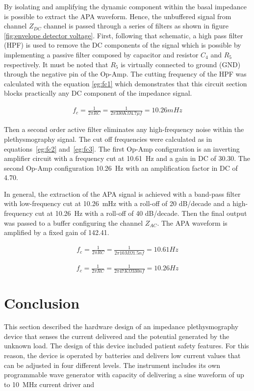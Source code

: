 By isolating and amplifying the dynamic component within the basal impedance is possible to extract the APA waveform. Hence, the unbuffered signal from channel $Z_{DC}$ channel is passed through a series of filters as shown in figure \ref{fig:envelope detector voltage}. First, following that schematic, a high pass filter (HPF) is used to remove the DC components of the signal which is possible by implementing a passive filter composed by capacitor and resistor  $C_4$ and $R_5$ respectively. It must be noted that $R_5$ is virtually connected to ground (GND) through the negative pin of the Op-Amp. The cutting frequency of the HPF was calculated with the equation \ref{eg:fc1} which demonstrates that this circuit section blocks practically any DC component of the impedance signal. 

\begin{align}
\label{eg:fc1}
f_c = \frac{1}{2 \pi R C} = \frac{1}{2 \pi 330K\Omega 4.7\mu f}=10.26 mHz
\end{align}

Then a second order active filter eliminates any high-frequency noise within the plethysmography signal. The cut off frequencies were calculated as in equations~\ref{eg:fc2} and~\ref{eg:fc3}. The first Op-Amp configuration is an inverting amplifier circuit with a frequency cut at \SI{10.61}{\hertz} and a gain in DC of \num{30.30}. The second Op-Amp configuration \SI{10.26}{\hertz} with an amplification factor in DC of \num{4.70}. 

In general, the extraction of the APA signal is achieved with a band-pass filter with low-frequency cut at \SI{10.26}{\milli\hertz} with a roll-off of \num{20} dB/decade and a high-frequency cut at \SI{10.26}{\hertz} with a roll-off of \num{40} dB/decade. Then the final output was passed to a buffer configuring the channel $Z_{AC}$. The APA waveform is amplified by a fixed gain of \num{142.41}. 

\begin{align}
\label{eg:fc2}
f_c = \frac{1}{2 \pi R C} = \frac{1}{2 \pi 10M\Omega 1.5 nf}=10.61Hz
\end{align}

\begin{align}
\label{eg:fc3}
f_c = \frac{1}{2 \pi R C} = \frac{1}{2 \pi 47K\Omega 330nf}=10.26Hz
\end{align}

\section{Conclusion}
\label{conclusion impedance device}
This section described the hardware design of an impedance plethysmography device that senses the current delivered and the potential generated by the unknown load. The design of this device included patient safety features. For this reason, the device is operated by batteries and delivers low current values that can be adjusted in four different levels. The instrument includes its own programmable wave generator with capacity of delivering a sine waveform of up to \SI{10}{\mega\hertz} current driver and

